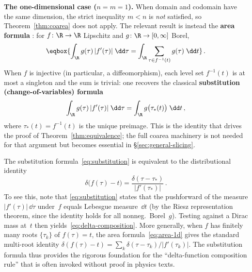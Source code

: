 \noindent
\textbf{The one-dimensional case ($n = m = 1$).}  When domain and
codomain have the same dimension, the strict inequality $m < n$ is
\emph{not} satisfied, so Theorem~\ref{thm:coarea} does not apply.
The relevant result is instead the \textbf{area formula}
\cite[Theorem~3.2.3]{Federer69}: for $f\colon \R \to \R$ Lipschitz
and $g\colon \R \to [0,\infty]$ Borel,
\begin{equation}\label{eq:area-1d}
  \eqbox{
  \int_{\R} g(\tau)\,|f'(\tau)|\;\dd\tau
    = \int_{\R}
      \sum_{\tau\in f^{-1}(t)} g(\tau)\;\dd t}\,.
\end{equation}
When $f$ is injective (in particular, a diffeomorphism), each level
set $f^{-1}(t)$ is at most a singleton and the sum is trivial: one
recovers the classical \textbf{substitution (change-of-variables)
formula}
\begin{equation}\label{eq:substitution}
  \int_{\R} g(\tau)\,|f'(\tau)|\;\dd\tau
    = \int_{\R} g\bigl(\tau_\ast(t)\bigr)\;\dd t\,,
\end{equation}
where $\tau_\ast(t) = f^{-1}(t)$ is the unique preimage.  This is
the identity that drives the proof of
Theorem~\ref{thm:equivalence}; the full coarea machinery is not
needed for that argument but becomes essential in
\S\ref{sec:general-slicing}.

\begin{remark}%
\label{rem:delta-composition}
  The substitution formula~\eqref{eq:substitution} is equivalent to
  the distributional identity
  \begin{equation}\label{eq:delta-composition}
    \delta\bigl(f(\tau) - t\bigr)
      = \frac{\delta(\tau - \tau_\ast)}{|f'(\tau_\ast)|}\,.
  \end{equation}
  To see this, note that \eqref{eq:substitution} states that
  the pushforward of the measure $|f'(\tau)|\,\dd\tau$ under~$f$
  equals Lebesgue measure~$\dd t$ (by the Riesz representation
  theorem, since the identity holds for all nonneg.\ Borel~$g$).
  Testing against a Dirac mass at~$t$ then
  yields~\eqref{eq:delta-composition}.  More generally, when $f$ has
  finitely many roots $\{\tau_k\}$ of $f(\tau) = t$, the area
  formula~\eqref{eq:area-1d} gives the standard multi-root identity
  $\delta(f(\tau) - t) = \sum_k
  \delta(\tau - \tau_k)/|f'(\tau_k)|$.  The substitution formula thus
  provides the rigorous foundation for the ``delta-function
  composition rule'' that is often invoked without proof in physics
  texts.
\end{remark}
